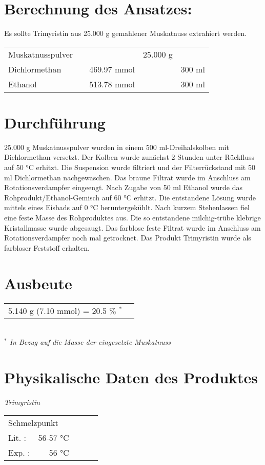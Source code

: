 \documentclass[12pt]{article}
\begin{document}
\begin{onehalfspace}
\section{Berechnung des Ansatzes: } 
Es sollte Trimyristin aus 25.000 g gemahlener Muskatnuss extrahiert werden. \\[0.5cm]
\begin{tabular}{lrrrr}
Muskatnusspulver	&   &  & 25.000 g & \\
Dichlormethan  &  &   469.97 mmol &  & 300 ml\\
Ethanol  &  & 513.78 mmol &  & 300 ml\\
\end{tabular}


\section{Durchführung \cite{stahl}} 
25.000 g Muskatnusspulver wurden in einem 500 ml-Dreihalskolben mit Dichlormethan versetzt. Der Kolben wurde zunächst 2 Stunden unter Rückfluss auf 50 \si{\celsius} erhitzt. Die Suspension wurde filtriert und der Filterrückstand mit 50 ml Dichlormethan nachgewaschen. Das braune Filtrat wurde im Anschluss am Rotationsverdampfer eingeengt. Nach Zugabe von 50 ml Ethanol wurde das Rohprodukt/Ethanol-Gemisch auf 60 \si{\celsius} erhitzt. Die entstandene Lösung wurde mittels eines Eisbads auf 0 \si{\celsius} heruntergekühlt. Nach kurzem Stehenlassen fiel eine feste Masse des Rohproduktes aus. Die so entstandene milchig-trübe klebrige Kristallmasse wurde abgesaugt. Das farblose feste Filtrat wurde im Anschluss am Rotationsverdampfer noch mal getrocknet. Das Produkt Trimyristin wurde als farbloser Feststoff erhalten.
\section{Ausbeute} 
\begin{tabular}{ rl}
 5.140 g (7.10 mmol) =   20.5 \% $^\ast$\\
 \end{tabular}\\[0.5cm]
\footnotesize \textit{$^\ast$ In Bezug auf die Masse der eingesetzte Muskatnuss}
\normalsize \section{Physikalische Daten des Produktes} 
\textit{Trimyristin} \\[0.2cm]
\begin{tabular}{ lrclc }
 \multicolumn{2}{l}{Schmelzpunkt} & &   \\
   Lit. \cite{stahl} : &  56-57 \si{\celsius}  & &  \\
   Exp. :&  56 \si{\celsius} & &  \\
 \end{tabular}

\end{onehalfspace}
\end{document}
